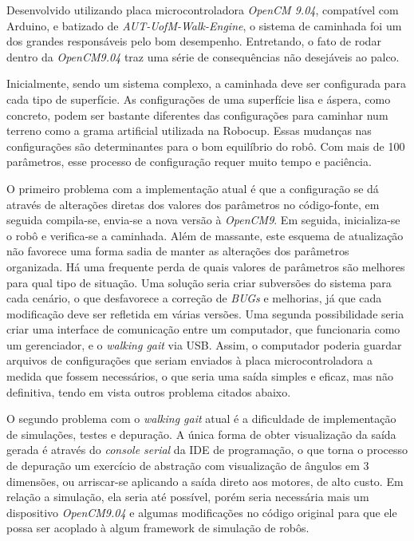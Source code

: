 Desenvolvido utilizando placa microcontroladora \textit{OpenCM 9.04}, compatível com Arduino, e batizado de \textit{AUT-UofM-Walk-Engine}, o sistema de caminhada foi um dos grandes responsáveis pelo bom desempenho. Entretando, o fato de rodar dentro da \textit{OpenCM9.04} traz uma série de consequências não desejáveis ao palco.

Inicialmente, sendo um sistema complexo, a caminhada deve ser configurada para cada tipo de superfície. As configurações de uma superfície lisa e áspera, como concreto, podem ser bastante diferentes das configurações para caminhar num terreno como a grama artificial utilizada na Robocup. Essas mudanças nas configurações são determinantes para o bom equilíbrio do robô. Com mais de 100 parâmetros, esse processo de configuração requer muito tempo e paciência.

O primeiro problema com a implementação atual é que a configuração se dá através de alterações diretas dos valores dos parâmetros no código-fonte, em seguida compila-se, envia-se a nova versão à \textit{OpenCM9}. Em seguida, inicializa-se o robô e verifica-se a caminhada. Além de massante, este esquema de atualização não favorece uma forma sadia de manter as alterações dos parâmetros organizada. Há uma frequente perda de quais valores de parâmetros são melhores para qual tipo de situação. Uma solução seria criar subversões do sistema para cada cenário, o que desfavorece a correção de \textit{BUGs} e melhorias, já que cada modificação deve ser refletida em várias versões. Uma segunda possibilidade seria criar uma interface de comunicação entre um computador, que funcionaria como um gerenciador, e o \textit{walking gait} via USB. Assim, o computador poderia guardar arquivos de configurações que seriam enviados à placa microcontroladora a medida que fossem necessários, o que seria uma saída simples e eficaz, mas não definitiva, tendo em vista outros problema citados abaixo.

O segundo problema com o \textit{walking gait} atual é a dificuldade de implementação de simulações, testes e depuração. A única forma de obter visualização da saída gerada é através do \textit{console serial} da IDE de programação, o que torna o processo de depuração um exercício de abstração com visualização de ângulos em 3 dimensões, ou arriscar-se aplicando a saída direto aos motores, de alto custo. Em relação a simulação, ela seria até possível, porém seria necessária mais um dispositivo \textit{OpenCM9.04} e algumas modificações no código original para que ele possa ser acoplado à algum framework de simulação de robôs.

